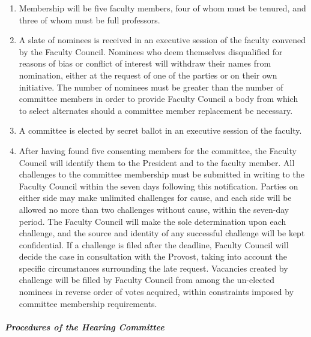 					\begin{enumerate}[label=\alph*)]

						\item{Membership will be five faculty members, four of whom must be tenured, and three of whom must be full professors.}

						\item{A slate of nominees is received in an executive session of the faculty convened by the Faculty Council.  Nominees who deem themselves disqualified for reasons of bias or conflict of interest will withdraw their names from nomination, either at the request of one of the parties or on their own initiative.  The number of nominees must be greater than the number of committee members in order to provide Faculty Council a body from which to select alternates should a committee member replacement be necessary.}

						\item{A committee is elected by secret ballot in an executive session of the faculty.}

						\item{After having found five consenting members for the committee, the Faculty Council will identify them to the President and to the faculty member.  All challenges to the committee membership must be submitted in writing to the Faculty Council within the seven days following this notification.  Parties on either side may make unlimited challenges for cause, and each side will be allowed no more than two challenges without cause, within the seven-day period.  The Faculty Council will make the sole determination upon each challenge, and the source and identity of any successful challenge will be kept confidential.  If a challenge is filed after the deadline, Faculty Council will decide the case in consultation with the Provost, taking into account the specific circumstances surrounding the late request.  Vacancies created by challenge will be filled by Faculty Council from among the un-elected nominees in reverse order of votes acquired, within constraints imposed by committee membership requirements.}

					\end{enumerate}
				\subparagraph{Procedures of the Hearing Committee}
					\label{sec:DischargeForCauseHearing-ProceduresOfTheHearingCommittee}

